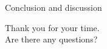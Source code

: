 \begin{frame}{Conclusion and discussion}

\centering \LARGE Thank you for your time. \\ Are there any questions?

\end{frame}